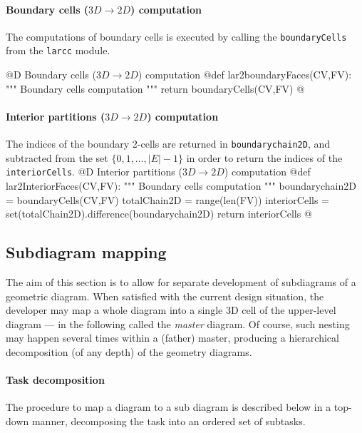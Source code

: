 \documentclass[11pt,oneside]{article}	%
\begin{document}
\paragraph{Boundary cells ($3D\to 2D$) computation}
The computations of boundary cells is executed by calling the \texttt{boundaryCells} from the \texttt{larcc} module.

@D Boundary cells ($3D\to 2D$) computation
@{def lar2boundaryFaces(CV,FV):
	""" Boundary cells computation """
	return boundaryCells(CV,FV)
@}

\paragraph{Interior partitions ($3D\to 2D$) computation}
The indices of the boundary 2-cells are returned in \texttt{boundarychain2D}, and subtracted from the set $\{0,1,\ldots,|E|-1\}$ in order to return the indices of the \texttt{interiorCells}.
@D Interior partitions ($3D\to 2D$) computation
@{def lar2InteriorFaces(CV,FV):
	""" Boundary cells computation """
	boundarychain2D = boundaryCells(CV,FV)
	totalChain2D = range(len(FV))
	interiorCells = set(totalChain2D).difference(boundarychain2D)
	return interiorCells
@}


\subsection{Subdiagram mapping}

The aim of this section is to allow for separate development of subdiagrams of a geometric diagram.
When satisfied with the current design situation,  the developer may map a whole diagram into a single 3D cell of the upper-level diagram --- in the following called the \emph{master} diagram.
Of course, such nesting may happen several times within a (father) master, producing a hierarchical decomposition (of any depth) of the geometry diagrams.


\paragraph{Task decomposition}
The procedure to map a diagram to a sub diagram is described below in a top-down manner,
decomposing the task into an ordered set of subtasks.
\end{document}
